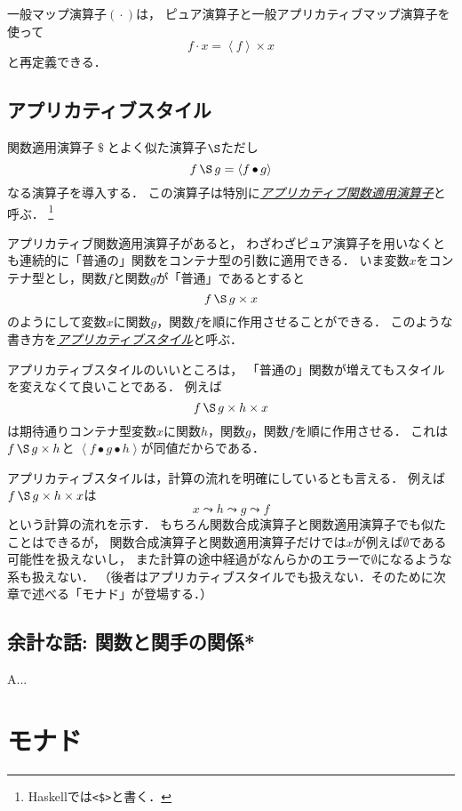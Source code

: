 \documentclass[a5paper,draft]{jsbook}
\newcommand{\programminglanguage}[1]{\textsf{#1}}
\newcommand{\haskell}{\programminglanguage{Haskell}}
\newcommand{\keyword}[1]{{\underline{\emph{#1}}}}
\newcommand{\code}[1]{\texttt{#1}}
\newcommand{\mathPureWith}[1]{\left\langle#1\right\rangle}
\newcommand{\mathNothing}{\emptyset}%
\newcommand{\mathBinaryOperator}[1]{\operatorname{#1}}
\newcommand{\mathApplicativeApply}{\mathBinaryOperator{\S}}
\newcommand{\mathApplicativeGeneralMap}{\times}
\newcommand{\mathApply}{\mathBinaryOperator{\$}}
\newcommand{\mathCompose}{\mathBinaryOperator{\bullet}}
\newcommand{\mathGeneralMap}{\mathBinaryOperator{\cdot}}
\begin{document}
一般マップ演算子$(\mathGeneralMap)$は，
ピュア演算子と一般アプリカティブマップ演算子を使って
$$
f\mathGeneralMap x=\mathPureWith{f}\mathApplicativeGeneralMap x
$$
と再定義できる．

\section{アプリカティブスタイル}

関数適用演算子$\mathApply$とよく似た演算子$\mathApplicativeApply$ただし
$$
f\mathApplicativeApply g=\mathPureWith{f\mathCompose g}
$$
なる演算子を導入する．
この演算子は特別に\keyword{アプリカティブ関数適用演算子}と呼ぶ．%
\footnote{\haskell では\code{<\$>}と書く．}

アプリカティブ関数適用演算子があると，
わざわざピュア演算子を用いなくとも連続的に「普通の」関数をコンテナ型の引数に適用できる．
いま変数$x$をコンテナ型とし，関数$f$と関数$g$が「普通」であるとすると
$$
f\mathApplicativeApply g\mathApplicativeGeneralMap x
$$
のようにして変数$x$に関数$g$，関数$f$を順に作用させることができる．
このような書き方を\keyword{アプリカティブスタイル}と呼ぶ．

アプリカティブスタイルのいいところは，
「普通の」関数が増えてもスタイルを変えなくて良いことである．
例えば
$$
f\mathApplicativeApply g\mathApplicativeGeneralMap h\mathApplicativeGeneralMap x
$$
は期待通りコンテナ型変数$x$に関数$h$，関数$g$，関数$f$を順に作用させる．
これは$f\mathApplicativeApply g\mathApplicativeGeneralMap h$と%
$\mathPureWith{f\mathCompose g\mathCompose h}$が同値だからである．

アプリカティブスタイルは，計算の流れを明確にしているとも言える．
例えば$f\mathApplicativeApply g\mathApplicativeGeneralMap h\mathApplicativeGeneralMap x$は
$$
x\leadsto h\leadsto g\leadsto f
$$
という計算の流れを示す．
もちろん関数合成演算子と関数適用演算子でも似たことはできるが，
関数合成演算子と関数適用演算子だけでは$x$が例えば$\mathNothing$である可能性を扱えないし，
また計算の途中経過がなんらかのエラーで$\mathNothing$になるような系も扱えない．
（後者はアプリカティブスタイルでも扱えない．そのために次章で述べる「モナド」が登場する．）

\section{余計な話: 関数と関手の関係*}

A...



\chapter{モナド}
\end{document}
